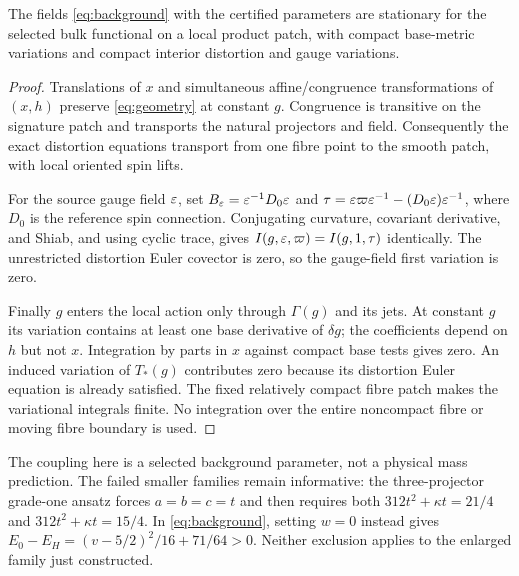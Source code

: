 \begin{proposition}
The fields \eqref{eq:background} with the certified parameters are stationary
for the selected bulk functional on a local product patch, with compact
base-metric variations and compact interior distortion and gauge variations.
\end{proposition}
\begin{proof}
Translations of $x$ and simultaneous affine/congruence transformations of
$(x,h)$ preserve \eqref{eq:geometry} at constant $g$. Congruence is transitive
on the signature patch and transports the natural projectors and field.
Consequently the exact distortion equations transport from one fibre point
to the smooth patch, with local oriented spin lifts.

For the source gauge field $\varepsilon$, set
$B_\varepsilon=\varepsilon^{-1}D_0\varepsilon$ and
$\tau=\varepsilon\varpi\varepsilon^{-1}-(D_0\varepsilon)\varepsilon^{-1}$, where $D_0$ is the
reference spin connection. Conjugating curvature, covariant derivative,
and Shiab, and using cyclic trace, gives
$I(g,\varepsilon,\varpi)=I(g,1,\tau)$ identically. The unrestricted distortion
Euler covector is zero, so the gauge-field first variation is zero.

Finally $g$ enters the local action only through $\Gamma(g)$ and its
jets. At constant $g$ its variation contains at least one base derivative
of $\delta g$; the coefficients depend on $h$ but not $x$.
Integration by parts in $x$ against compact base tests gives zero.
An induced variation of $T_*(g)$ contributes zero because its distortion
Euler equation is already satisfied. The fixed relatively compact fibre
patch makes the variational integrals finite. No integration over the
entire noncompact fibre or moving fibre boundary is used.
\end{proof}

The coupling here is a selected background parameter, not a physical
mass prediction. The failed smaller families remain informative: the
three-projector grade-one ansatz forces $a=b=c=t$ and then requires both
$312t^2+\kappa t=21/4$ and $312t^2+\kappa t=15/4$.
In \eqref{eq:background}, setting $w=0$ instead gives
$E_0-E_H=(v-5/2)^2/16+71/64>0$.
Neither exclusion applies to the enlarged family just constructed.
